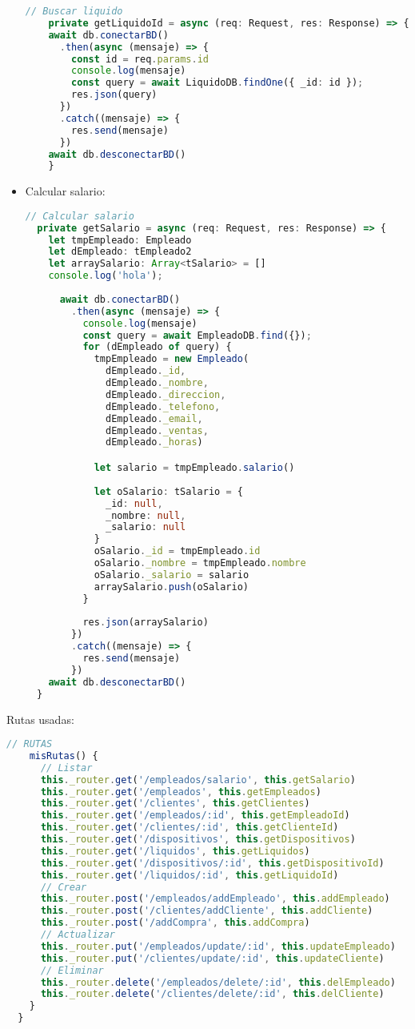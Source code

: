 \documentclass[a4paper]{article} %
\begin{document}
\begin{itemize}
\begin{lstlisting}[language=Typescript]
	// Buscar liquido
	private getLiquidoId = async (req: Request, res: Response) => {
	await db.conectarBD()
	  .then(async (mensaje) => {
		const id = req.params.id
		console.log(mensaje)
		const query = await LiquidoDB.findOne({ _id: id });
		res.json(query)
	  })
	  .catch((mensaje) => {
		res.send(mensaje)
	  })
	await db.desconectarBD()
	}
\end{lstlisting}\clearpage
	\item Calcular salario:
\begin{lstlisting}[language=Typescript]
	// Calcular salario
  private getSalario = async (req: Request, res: Response) => {
    let tmpEmpleado: Empleado
    let dEmpleado: tEmpleado2
    let arraySalario: Array<tSalario> = []
    console.log('hola');
    
      await db.conectarBD()
        .then(async (mensaje) => {
          console.log(mensaje)
          const query = await EmpleadoDB.find({});
          for (dEmpleado of query) {
            tmpEmpleado = new Empleado(
              dEmpleado._id,
              dEmpleado._nombre,
              dEmpleado._direccion,
              dEmpleado._telefono,
              dEmpleado._email,
              dEmpleado._ventas,
              dEmpleado._horas)

            let salario = tmpEmpleado.salario()
            
            let oSalario: tSalario = {
              _id: null,
              _nombre: null,
              _salario: null
            }
            oSalario._id = tmpEmpleado.id
            oSalario._nombre = tmpEmpleado.nombre
            oSalario._salario = salario
            arraySalario.push(oSalario)
          }
          
          res.json(arraySalario)
        })
        .catch((mensaje) => {
          res.send(mensaje)
        })
    await db.desconectarBD()
  }
\end{lstlisting}\clearpage
\end{itemize}
Rutas usadas:
\begin{lstlisting}[language=Typescript]
	// RUTAS
	misRutas() {
	  // Listar
	  this._router.get('/empleados/salario', this.getSalario)
	  this._router.get('/empleados', this.getEmpleados)
	  this._router.get('/clientes', this.getClientes)
	  this._router.get('/empleados/:id', this.getEmpleadoId)
	  this._router.get('/clientes/:id', this.getClienteId)
	  this._router.get('/dispositivos', this.getDispositivos)
	  this._router.get('/liquidos', this.getLiquidos)
	  this._router.get('/dispositivos/:id', this.getDispositivoId)
	  this._router.get('/liquidos/:id', this.getLiquidoId)
	  // Crear
	  this._router.post('/empleados/addEmpleado', this.addEmpleado)
	  this._router.post('/clientes/addCliente', this.addCliente)
	  this._router.post('/addCompra', this.addCompra)
	  // Actualizar
	  this._router.put('/empleados/update/:id', this.updateEmpleado)
	  this._router.put('/clientes/update/:id', this.updateCliente)
	  // Eliminar
	  this._router.delete('/empleados/delete/:id', this.delEmpleado)
	  this._router.delete('/clientes/delete/:id', this.delCliente)
	}
  }
\end{lstlisting}\clearpage
\end{document}
